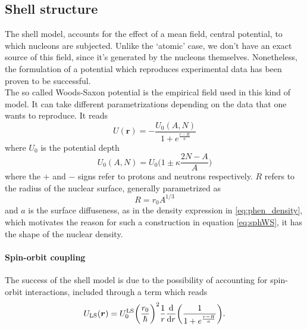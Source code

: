 \subsection{Shell structure}
The shell model, accounts for the effect of a mean field, central potential, to which nucleons are subjected. Unlike the `atomic' case, we don't have an exact source of this field, since it's generated by the nucleons themselves. Nonetheless, the formulation of a potential which reproduces experimental data has been proven to be successful.
\\The so called Woods-Saxon potential is the empirical field used in this kind of model. It can take different parametrizations depending on the data that one wants to reproduce. It reads
\begin{equation}
    \label{eq:sphWS}
    U(\bm r) = -\frac{U_0(A, N)}{1+e^\frac{r - R}{a}}
\end{equation}
where $U_0$ is the potential depth
\begin{equation}
    U_0(A, N) = U_0\bigg(1\pm \kappa \frac{2N -A }A\bigg)
\end{equation}
where the $+$ and $-$ signs refer to protons and neutrons respectively. $R$ refers to the radius of the nuclear surface, generally parametrized as 
\begin{equation}
    R=r_0 A^{1/3}
\end{equation}
and $a$ is the surface diffuseness, as in the density expression in \eqref{eq:phen_density}, which motivates the reason for such a construction in equation \eqref{eq:sphWS}, it has the shape of the nuclear density.
\paragraph{Spin-orbit coupling} 
The success of the shell model is due to the possibility of accounting for spin-orbit interactions, included through a term which reads
\begin{equation}
    U_{\text{LS}}(\bm r )=U_0^{\text{LS}}\bigg(\frac{r_0}{\hbar}\bigg)^2 \frac 1 r \dv{}{r}\bigg (\frac{1}{1+e^{\frac{r-R}{a}}}\bigg).
\end{equation}
